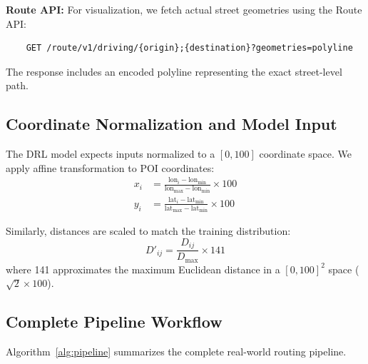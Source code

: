 \documentclass[11pt,a4paper]{article}
\begin{document}
\textbf{Route API:} For visualization, we fetch actual street geometries using the Route API:
\begin{verbatim}
    GET /route/v1/driving/{origin};{destination}?geometries=polyline
\end{verbatim}
The response includes an encoded polyline representing the exact street-level path.

\subsection{Coordinate Normalization and Model Input}

The DRL model expects inputs normalized to a $[0, 100]$ coordinate space. We apply affine transformation to POI coordinates:
\begin{align}
x_i &= \frac{\text{lon}_i - \text{lon}_{\min}}{\text{lon}_{\max} - \text{lon}_{\min}} \times 100 \\
y_i &= \frac{\text{lat}_i - \text{lat}_{\min}}{\text{lat}_{\max} - \text{lat}_{\min}} \times 100
\end{align}

Similarly, distances are scaled to match the training distribution:
\begin{equation}
D'_{ij} = \frac{D_{ij}}{D_{\max}} \times 141
\end{equation}
where 141 approximates the maximum Euclidean distance in a $[0,100]^2$ space ($\sqrt{2} \times 100$).

\subsection{Complete Pipeline Workflow}

Algorithm~\ref{alg:pipeline} summarizes the complete real-world routing pipeline.
\end{document}

